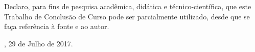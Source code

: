 \documentclass[
	12pt,				%
	openright,			%
	oneside,			%
	a4paper,			%
	english,			%
	french,				%
	spanish,			%
	brazil				%
	]{abntex2}
\begin{document}
\begin{declaracaodoautor}

  \vspace*{1.5cm}

  Declaro, para fins de pesquisa acadêmica, didática e
  técnico-científica, que este Trabalho de Conclusão de Curso pode ser
  parcialmente utilizado, desde que se faça referência à fonte e ao
  autor.

  \vspace*{2.5cm}

  \centering

  \imprimirlocal, 29 de Julho de 2017.

  \vspace*{2.5cm}

  \imprimirautor

  \vspace*{\fill}
  
\end{declaracaodoautor}

%
\end{document}
